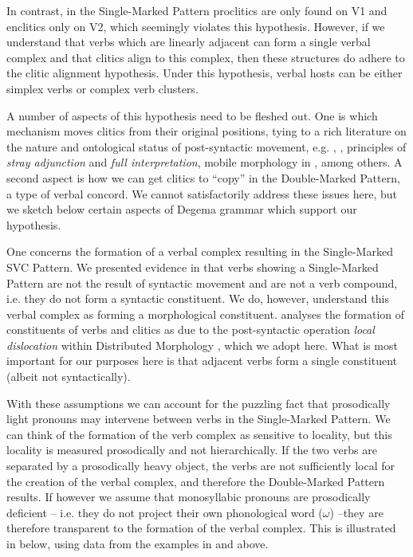 \documentclass[output=paper]{langsci/langscibook}
\begin{document}
In contrast, in the Single-Marked Pattern proclitics are only found on V1 and enclitics only on V2, which seemingly violates this hypothesis. However, if we understand that verbs which are linearly adjacent can form a single verbal complex and that clitics align to this complex, then these structures do adhere to the clitic alignment hypothesis. Under this hypothesis, verbal hosts can be either simplex verbs or complex verb clusters.

A number of aspects of this hypothesis need to be fleshed out. One is which mechanism moves clitics from their original positions, tying to a rich literature on the nature and ontological status of post-syntactic movement, e.g. \citet{NesporVogel1986}, \citet{Bošković2001},  principles of \textit{stray adjunction} and\textit{ full interpretation}, mobile morphology in \citet{JenksRose2015}, among others. A second aspect is how we can get clitics to “copy” in the Double-Marked Pattern, a type of verbal concord. We cannot satisfactorily address these issues here, but we sketch below certain aspects of Degema grammar which support our hypothesis. 

One concerns the formation of a verbal complex resulting in the Single-Marked SVC Pattern. We presented evidence in  that verbs showing a Single-Marked Pattern are not the result of syntactic movement and are not a verb compound, i.e. they do not form a syntactic constituent. We do, however, understand this verbal complex as forming a morphological constituent. \citet{Rolle2015} analyses the formation of constituents of verbs and clitics as due to the post-syntactic operation \textit{local dislocation} within Distributed Morphology \citep{EmbickNoyer2001,EmbickNoyer2007}, which we adopt here. What is most important for our purposes here is that adjacent verbs form a single constituent (albeit not syntactically). 

With these assumptions we can account for the puzzling fact that prosodically light pronouns may intervene between verbs in the Single-Marked Pattern. We can think of the formation of the verb complex as sensitive to locality, but this locality is measured prosodically and not hierarchically. If the two verbs are separated by a prosodically heavy object, the verbs are not sufficiently local for the creation of the verbal complex, and therefore the Double-Marked Pattern results. If however we assume that monosyllabic pronouns are prosodically deficient – i.e. they do not project their own phonological word ($\omega $) –they are therefore transparent to the formation of the verbal complex. This is illustrated in  below, using data from the examples in  and  above. 
\end{document}
